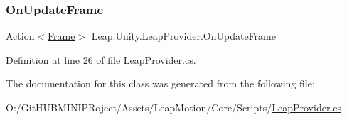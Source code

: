 \subsubsection{\texorpdfstring{OnUpdateFrame}{OnUpdateFrame}}
{\footnotesize\ttfamily Action$<$\mbox{\hyperlink{class_leap_1_1_frame}{Frame}}$>$ Leap.\+Unity.\+Leap\+Provider.\+On\+Update\+Frame}



Definition at line 26 of file Leap\+Provider.\+cs.



The documentation for this class was generated from the following file\+:\begin{DoxyCompactItemize}
\item 
O\+:/\+Git\+H\+U\+B\+M\+I\+N\+I\+P\+Roject/\+Assets/\+Leap\+Motion/\+Core/\+Scripts/\mbox{\hyperlink{_leap_provider_8cs}{Leap\+Provider.\+cs}}\end{DoxyCompactItemize}
